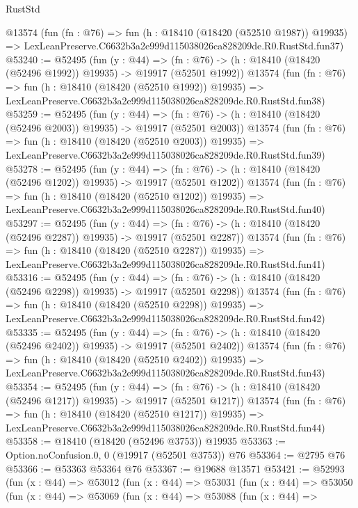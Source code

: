 \begin{lexlean}{RustStd}
\begin{coremodule}
    @13574
    (fun (fn : @76) =>
    fun (h : @18410 (@18420 (@52510 @1987)) @19935) =>
    LexLeanPreserve.C6632b3a2e999d115038026ca828209de.R0.RustStd.fun37)
@53240 := @52495
    (fun (y : @44) =>
    (fn : @76) -> (h : @18410 (@18420 (@52496 @1992)) @19935) -> @19917 (@52501 @1992))
    @13574
    (fun (fn : @76) =>
    fun (h : @18410 (@18420 (@52510 @1992)) @19935) =>
    LexLeanPreserve.C6632b3a2e999d115038026ca828209de.R0.RustStd.fun38)
@53259 := @52495
    (fun (y : @44) =>
    (fn : @76) -> (h : @18410 (@18420 (@52496 @2003)) @19935) -> @19917 (@52501 @2003))
    @13574
    (fun (fn : @76) =>
    fun (h : @18410 (@18420 (@52510 @2003)) @19935) =>
    LexLeanPreserve.C6632b3a2e999d115038026ca828209de.R0.RustStd.fun39)
@53278 := @52495
    (fun (y : @44) =>
    (fn : @76) -> (h : @18410 (@18420 (@52496 @1202)) @19935) -> @19917 (@52501 @1202))
    @13574
    (fun (fn : @76) =>
    fun (h : @18410 (@18420 (@52510 @1202)) @19935) =>
    LexLeanPreserve.C6632b3a2e999d115038026ca828209de.R0.RustStd.fun40)
@53297 := @52495
    (fun (y : @44) =>
    (fn : @76) -> (h : @18410 (@18420 (@52496 @2287)) @19935) -> @19917 (@52501 @2287))
    @13574
    (fun (fn : @76) =>
    fun (h : @18410 (@18420 (@52510 @2287)) @19935) =>
    LexLeanPreserve.C6632b3a2e999d115038026ca828209de.R0.RustStd.fun41)
@53316 := @52495
    (fun (y : @44) =>
    (fn : @76) -> (h : @18410 (@18420 (@52496 @2298)) @19935) -> @19917 (@52501 @2298))
    @13574
    (fun (fn : @76) =>
    fun (h : @18410 (@18420 (@52510 @2298)) @19935) =>
    LexLeanPreserve.C6632b3a2e999d115038026ca828209de.R0.RustStd.fun42)
@53335 := @52495
    (fun (y : @44) =>
    (fn : @76) -> (h : @18410 (@18420 (@52496 @2402)) @19935) -> @19917 (@52501 @2402))
    @13574
    (fun (fn : @76) =>
    fun (h : @18410 (@18420 (@52510 @2402)) @19935) =>
    LexLeanPreserve.C6632b3a2e999d115038026ca828209de.R0.RustStd.fun43)
@53354 := @52495
    (fun (y : @44) =>
    (fn : @76) -> (h : @18410 (@18420 (@52496 @1217)) @19935) -> @19917 (@52501 @1217))
    @13574
    (fun (fn : @76) =>
    fun (h : @18410 (@18420 (@52510 @1217)) @19935) =>
    LexLeanPreserve.C6632b3a2e999d115038026ca828209de.R0.RustStd.fun44)
@53358 := @18410 (@18420 (@52496 @3753)) @19935
@53363 := Option.noConfusion.{0, 0} (@19917 (@52501 @3753)) @76
@53364 := @2795 @76
@53366 := @53363 @53364 @76
@53367 := @19688 @13571
@53421 := @52993
    (fun (x : @44) =>
    @53012
      (fun (x : @44) =>
      @53031
        (fun (x : @44) =>
        @53050
          (fun (x : @44) =>
          @53069
            (fun (x : @44) =>
            @53088
              (fun (x : @44) =>

\end{coremodule}
\end{lexlean}
